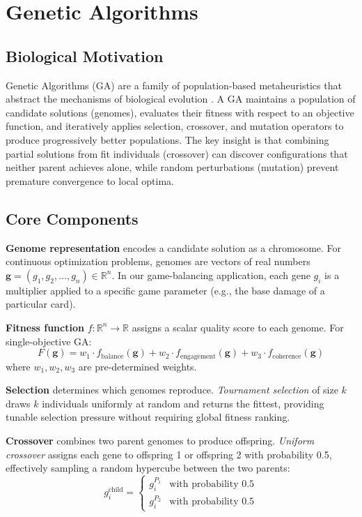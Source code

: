 \section{Genetic Algorithms}

\subsection{Biological Motivation}

Genetic Algorithms (GA) are a family of population-based metaheuristics that abstract the mechanisms of biological evolution \cite{holland1992adaptation}. A GA maintains a population of candidate solutions (genomes), evaluates their fitness with respect to an objective function, and iteratively applies selection, crossover, and mutation operators to produce progressively better populations. The key insight is that combining partial solutions from fit individuals (crossover) can discover configurations that neither parent achieves alone, while random perturbations (mutation) prevent premature convergence to local optima.

\subsection{Core Components}

\textbf{Genome representation} encodes a candidate solution as a chromosome. For continuous optimization problems, genomes are vectors of real numbers $\mathbf{g} = (g_1, g_2, \ldots, g_n) \in \mathbb{R}^n$. In our game-balancing application, each gene $g_i$ is a multiplier applied to a specific game parameter (e.g., the base damage of a particular card).

\textbf{Fitness function} $f: \mathbb{R}^n \to \mathbb{R}$ assigns a scalar quality score to each genome. For single-objective GA:
\begin{equation}
F(\mathbf{g}) = w_1 \cdot f_{\text{balance}}(\mathbf{g}) + w_2 \cdot f_{\text{engagement}}(\mathbf{g}) + w_3 \cdot f_{\text{coherence}}(\mathbf{g})
\label{eq:ga_fitness}
\end{equation}
where $w_1, w_2, w_3$ are pre-determined weights.

\textbf{Selection} determines which genomes reproduce. \textit{Tournament selection} of size $k$ draws $k$ individuals uniformly at random and returns the fittest, providing tunable selection pressure without requiring global fitness ranking.

\textbf{Crossover} combines two parent genomes to produce offspring. \textit{Uniform crossover} assigns each gene to offspring 1 or offspring 2 with probability 0.5, effectively sampling a random hypercube between the two parents:
\begin{equation}
g_i^{\text{child}} = \begin{cases} g_i^{P_1} & \text{with probability } 0.5 \\ g_i^{P_2} & \text{with probability } 0.5 \end{cases}
\end{equation}

